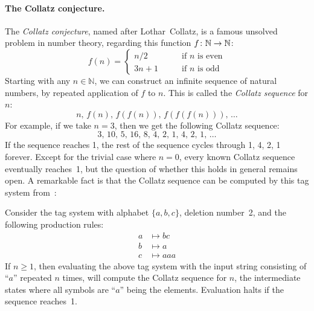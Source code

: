 \documentclass[../generics]{subfiles}
\begin{document}
\paragraph{The Collatz conjecture.} The \emph{Collatz conjecture}, named after Lothar~Collatz, is a famous unsolved problem in number theory, regarding this function $f\colon\mathbb{N}\rightarrow\mathbb{N}$:
\[
f(n) = \begin{cases}
n/2 &\qquad \mbox{if $n$ is even}\\
3n+1 &\qquad \mbox{if $n$ is odd}
\end{cases}
\]
Starting with any $n \in \mathbb{N}$, we can construct an infinite sequence of natural numbers, by repeated application of $f$ to $n$. This is called the \emph{Collatz sequence} for $n$:
\[n,\,f(n),\,f(f(n)),\,f(f(f(n))),\,\ldots\]
For example, if we take $n=3$, then we get the following Collatz sequence:
\[3,\,10,\,5,\,16,\,8,\,4,\,2,\,1,\,4,\,2,\,1,\,\ldots\]
If the sequence reaches 1, the rest of the sequence cycles through 1, 4, 2, 1 forever. Except for the trivial case where $n=0$, every known Collatz sequence eventually reaches~1, but the question of whether this holds in general remains open. A remarkable fact is that the Collatz sequence can be computed by this tag system from~\cite{collatztag}:
\begin{theorem}
Consider the tag system with alphabet $\{a,b,c\}$, deletion number~2, and the following production rules:
\begin{align*}
a &\mapsto bc\\
b &\mapsto a\\
c &\mapsto aaa
\end{align*}
If $n\geq 1$, then evaluating the above tag system with the input string consisting of ``$a$'' repeated $n$ times, will compute the Collatz sequence for $n$, the intermediate states where all symbols are ``$a$'' being the elements. Evaluation halts if the sequence reaches~1.
\end{theorem}
\end{document}
